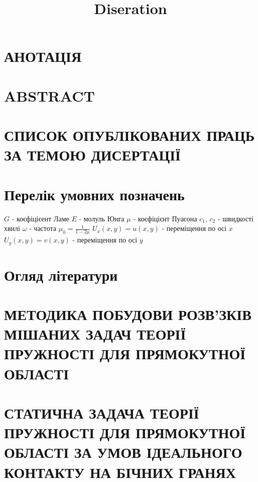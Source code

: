 \documentclass[a4paper,14pt]{extarticle}
\title{Diseration}
\author{}
\date{}
\numberwithin{equation}{section}
\begin{document}
\section*{\centering АНОТАЦІЯ}


\section*{\centering ABSTRACT}


\section*{\centering СПИСОК ОПУБЛІКОВАНИХ ПРАЦЬ ЗА ТЕМОЮ ДИСЕРТАЦІЇ}


\newpage

\renewcommand{\contentsname}{\centering Зміст}
\tableofcontents

\newpage

\section*{\centering Перелік умовних позначень}
$G$ - коєфіцієент Ламе \newline
$E$ - молуль Юнга \newline
$\mu$ - коєфіцієнт Пуасона \newline
$c_1$, $c_2$ - швидкості хвилі \newline
$\omega$ - частота \newline
$\mu_0 = \frac{1}{1 - 2\mu}$ \newline
$U_x(x,y) = u(x,y)$ - переміщення по осі $x$ \newline
$U_y(x,y) = v(x,y)$ - переміщення по осі $y$
\newpage

\section{Огляд літератури}
\newpage

\section{МЕТОДИКА ПОБУДОВИ РОЗВ’ЗКІВ МІШАНИХ ЗАДАЧ ТЕОРІЇ ПРУЖНОСТІ ДЛЯ ПРЯМОКУТНОЇ ОБЛАСТІ}

\newpage

\section{СТАТИЧНА ЗАДАЧА ТЕОРІЇ ПРУЖНОСТІ ДЛЯ ПРЯМОКУТНОЇ ОБЛАСТІ
ЗА УМОВ ІДЕАЛЬНОГО КОНТАКТУ НА БІЧНИХ ГРАНЯХ}

\newpage
\end{document}
